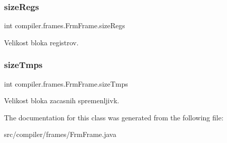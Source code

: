 \subsubsection{\texorpdfstring{size\+Regs}{sizeRegs}}
{\footnotesize\ttfamily int compiler.\+frames.\+Frm\+Frame.\+size\+Regs}

Velikost bloka registrov. \mbox{\label{classcompiler_1_1frames_1_1_frm_frame_ad3b018e20a2d43455419f7b00f30193a}} 
\subsubsection{\texorpdfstring{size\+Tmps}{sizeTmps}}
{\footnotesize\ttfamily int compiler.\+frames.\+Frm\+Frame.\+size\+Tmps}

Velikost bloka zacasnih spremenljivk. 

The documentation for this class was generated from the following file\+:\begin{DoxyCompactItemize}
\item 
src/compiler/frames/Frm\+Frame.\+java\end{DoxyCompactItemize}
